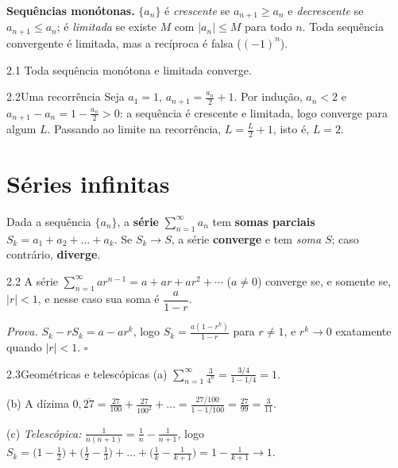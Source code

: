 \textbf{Sequências monótonas.} $\{a_n\}$ é \emph{crescente} se $a_{n+1}\ge a_n$ e
\emph{decrescente} se $a_{n+1}\le a_n$; é \emph{limitada} se existe $M$ com $|a_n|\le M$ para
todo $n$. Toda sequência convergente é limitada, mas a recíproca é falsa ($(-1)^n$).

\begin{teorema}{2.1}
Toda sequência monótona e limitada converge.
\end{teorema}

\begin{exemplo}{2.2}{Uma recorrência}
Seja $a_1=1$, $a_{n+1}=\frac{a_n}2+1$. Por indução, $a_n<2$ e $a_{n+1}-a_n=1-\frac{a_n}2>0$:
a sequência é crescente e limitada, logo converge para algum $L$. Passando ao limite na
recorrência, $L=\frac L2+1$, isto é, $L=2$.
\end{exemplo}

\section{Séries infinitas}

\begin{definicao}
Dada a sequência $\{a_n\}$, a \textbf{série} $\sum_{n=1}^\infty a_n$ tem
\textbf{somas parciais} $S_k=a_1+a_2+\dots+a_k$. Se $S_k\to S$, a série
\textbf{converge} e tem \emph{soma} $S$; caso contrário, \textbf{diverge}.
\end{definicao}

\begin{teorema}{2.2}
A série $\displaystyle\sum_{n=1}^\infty ar^{n-1}=a+ar+ar^2+\cdots$
($a\neq0$) converge se, e somente se, $|r|<1$, e nesse caso sua soma é $\dfrac a{1-r}$.
\end{teorema}
\emph{Prova.} $S_k-rS_k=a-ar^k$, logo $S_k=\frac{a(1-r^k)}{1-r}$ para $r\neq1$, e $r^k\to0$
exatamente quando $|r|<1$. $\square$

\begin{exemplo}{2.3}{Geométricas e telescópicas}
(a) $\sum_{n=1}^\infty\frac{3}{4^n}=\frac{3/4}{1-1/4}=1$.

(b) A dízima $0{,}\overline{27}=\frac{27}{100}+\frac{27}{100^2}+\dots=\frac{27/100}{1-1/100}=\frac{27}{99}=\frac3{11}$.

(c) \emph{Telescópica:} $\frac1{n(n+1)}=\frac1n-\frac1{n+1}$, logo
$S_k=\big(1-\tfrac12\big)+\big(\tfrac12-\tfrac13\big)+\dots+\big(\tfrac1k-\tfrac1{k+1}\big)=1-\tfrac1{k+1}\to1$.
\end{exemplo}

